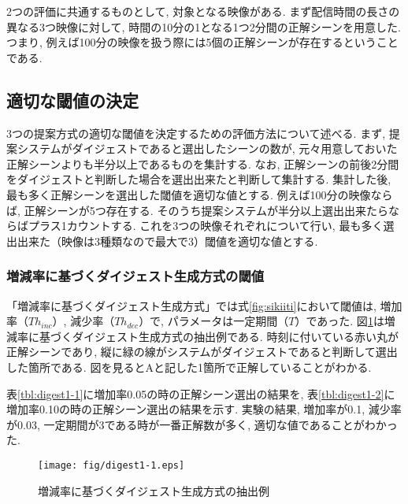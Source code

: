 2つの評価に共通するものとして, 対象となる映像がある. まず配信時間の長さの異なる3つ映像に対して, 時間の10分の1となる1つ2分間の正解シーンを用意した. つまり, 例えば100分の映像を扱う際には5個の正解シーンが存在するということである.

\subsection{適切な閾値の決定}
3つの提案方式の適切な閾値を決定するための評価方法について述べる. まず, 提案システムがダイジェストであると選出したシーンの数が, 元々用意しておいた正解シーンよりも半分以上であるものを集計する. なお, 正解シーンの前後2分間をダイジェストと判断した場合を選出出来たと判断して集計する. 集計した後, 最も多く正解シーンを選出した閾値を適切な値とする. 例えば100分の映像ならば, 正解シーンが5つ存在する. そのうち提案システムが半分以上選出出来たらならばプラス1カウントする. これを3つの映像それぞれについて行い, 最も多く選出出来た（映像は3種類なので最大で3）閾値を適切な値とする.

\subsubsection{増減率に基づくダイジェスト生成方式の閾値}
「増減率に基づくダイジェスト生成方式」では式\ref{fig:sikiiti}において閾値は, 増加率（$Th_{inc}$）, 減少率（$Th_{dec}$）で, パラメータは一定期間（$T$）であった. 図\ref{fig:digest1-1}は増減率に基づくダイジェスト生成方式の抽出例である. 時刻に付いている赤い丸が正解シーンであり, 縦に緑の線がシステムがダイジェストであると判断して選出した箇所である. 図を見るとAと記した1箇所で正解していることがわかる.

表\ref{tbl:digest1-1}に増加率0.05の時の正解シーン選出の結果を, 表\ref{tbl:digest1-2}に増加率0.10の時の正解シーン選出の結果を示す. 実験の結果, 増加率が0.1, 減少率が0.03, 一定期間が3である時が一番正解数が多く, 適切な値であることがわかった.

\begin{figure}[h]
  \centering
  \texttt{[image: fig/digest1-1.eps]}
  \caption{増減率に基づくダイジェスト生成方式の抽出例}
  \label{fig:digest1-1}
\end{figure}

